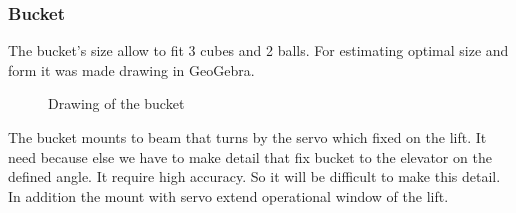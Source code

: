\subsubsection{Bucket} 
The bucket's size allow to fit 3 cubes and 2 balls.	\newline
For estimating optimal size and form it was made drawing in GeoGebra.
\begin{figure}[H]
	\begin{minipage}[h]{1\linewidth}
		\caption{Drawing of the bucket}
	\end{minipage}
\end{figure}  

The bucket mounts to beam that turns by the servo which fixed on the lift. It need because else we have to make detail that fix bucket to the elevator on the defined angle. It require high accuracy. So it will be difficult to make this detail. In addition the mount with servo extend operational window of the lift.

  	
   	
\fillpage
